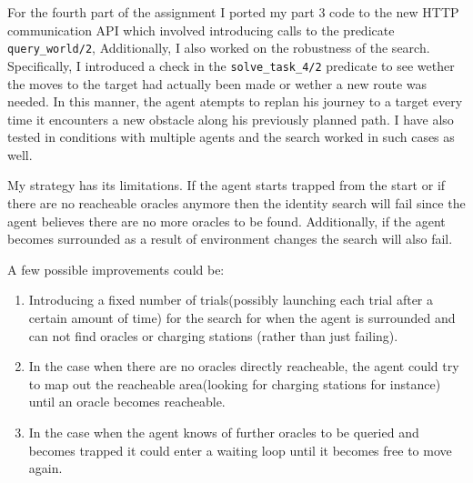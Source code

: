 \documentclass{article}
\begin{document}
        For the fourth part of the assignment I ported my part 3 code to the new HTTP
    communication API which involved introducing calls to the predicate \verb|query_world/2|, 
    Additionally, I also worked on the robustness of the search. Specifically,
    I introduced a check in the \verb|solve_task_4/2| predicate to see wether the 
    moves to the target had actually been made or wether a new route was needed.
    In this manner, the agent atempts to replan his journey to a target every time
    it encounters a new obstacle along his previously planned path.
        I have also tested in conditions with multiple agents and the search worked in 
    such cases as well.

    \indent My strategy has its limitations. If the agent starts trapped
    from the start or if there are no reacheable oracles anymore then the identity search will fail since 
    the agent believes there are no more oracles to be found. Additionally, if the agent becomes surrounded 
    as a result of environment changes the search will also fail.

    \indent A few possible improvements could be:
    \begin{enumerate}
        \item Introducing a fixed number of trials(possibly launching each trial after a certain amount of time) for the search for when the agent is surrounded and can not find oracles or charging stations (rather than just failing).
        \item In the case when there are no oracles directly reacheable, the agent could try to map out the reacheable area(looking for charging stations for instance) until an oracle becomes reacheable.
        \item In the case when the agent knows of further oracles to be queried and becomes trapped it could enter a waiting loop until it becomes free to move again.
    \end{enumerate}
\end{document}
